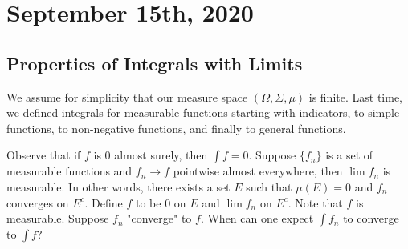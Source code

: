 \documentclass[11pt]{scrartcl}
\begin{document}
\section{September 15th, 2020}
\subsection{Properties of Integrals with Limits}
We assume for simplicity that our measure space $(\Omega, \Sigma, \mu)$ is finite.  Last time, we defined integrals for measurable functions starting with indicators, to simple functions, to non-negative functions, and finally to general functions.

Observe that if $f$ is $0$ almost surely, then $\int f = 0$.  Suppose $\{f_n\}$ is a set of measurable functions and $f_n \rightarrow f$ pointwise almost everywhere, then $\lim f_n$ is measurable.  In other words, there exists a set $E$ such that $\mu(E) = 0$ and $f_n$ converges on $E^c$.  Define $f$ to be $0$ on $E$ and $\lim f_n$ on $E^c$.  Note that $f$ is measurable.  Suppose $f_n$ "converge" to $f$.  When can one expect $\int f_n$ to converge to $\int f$?
\end{document}
